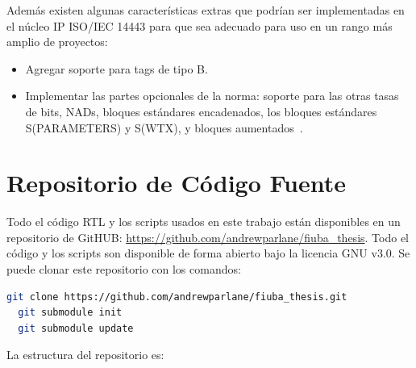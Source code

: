 \documentclass[a4paper, twoside, 11pt]{report}
\begin{document}
Además existen algunas características extras que podrían ser implementadas en el núcleo IP ISO/IEC 14443 para que sea adecuado para uso en un rango más amplio de proyectos:

\begin{itemize}
  \item Agregar soporte para tags de tipo B.
  \item Implementar las partes opcionales de la norma: soporte para las otras tasas de bits, NADs, bloques estándares encadenados, los bloques estándares S(PARAMETERS) y S(WTX), y bloques aumentados~\cite{iso14443-2}\cite{iso14443-4}.
\end{itemize}


\appendix

\titleformat{\chapter}[display]
{\normalfont\Huge\bfseries}{\chaptertitlename\ \thechapter:}{0.2em}{\huge}

\newpage
\chapter{Repositorio de Código Fuente}
\label{appendix:code_repo}

Todo el código RTL y los scripts usados en este trabajo están disponibles en un repositorio de GitHUB: \url{https://github.com/andrewparlane/fiuba_thesis}. Todo el código y los scripts son disponible de forma abierto bajo la licencia GNU v3.0. Se puede clonar este repositorio con los comandos:

\begin{lstlisting}[language=bash,basicstyle=\small]
  git clone https://github.com/andrewparlane/fiuba_thesis.git
  git submodule init
  git submodule update
\end{lstlisting}

La estructura del repositorio es:

\vspace{1em}

\end{document}
